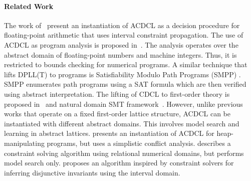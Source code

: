 \paragraph{Related Work}
The work of~\cite{sas13,DBLP:journals/fmsd/BrainDGHK14} present an
instantiation of ACDCL as a decision procedure for floating-point
arithmetic that uses interval constraint propagation.  
%
The use of
ACDCL as program analysis is proposed in~\cite{tacas12}.  The analysis
operates over the abstract domain of floating-point numbers and
machine integers.  Thus, it is restricted to bounds checking for
numerical programs.  
%
A similar technique that lifts DPLL(T) to
programs is Satisfiability Modulo Path Programs (SMPP) \cite{SMPP}. SMPP
enumerates path programs using a SAT formula which are then verified
using abstract interpretation.  
%
The lifting of CDCL to first-order theory is proposed
in~\cite{dpll,cp09} and natural domain SMT framework~\cite{ndsmt}.
 However, unlike
previous works that operate on a fixed first-order lattice structure,
ACDCL can be instantiated with different abstract domains.  This
involves model search and learning in abstract lattices.   
%
\cite{DBLP:journals/fmsd/BrainDGHK14} presents an instantiation of ACDCL for heap-manipulating programs, but uses a simplistic conflict analysis.
%
\cite{DBLP:conf/vmcai/PelleauMTB13} describes a constraint solving algorithm using relational numerical domains, but performs model search only.
%
\cite{DBLP:conf/esop/MineBR16} proposes an algorithm inspired by constraint solvers for inferring disjunctive invariants using the interval domain.

